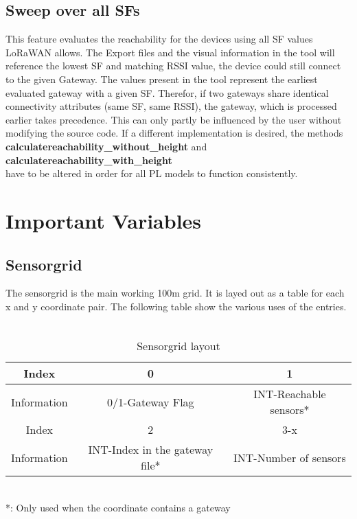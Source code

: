 \documentclass[12pt,a4paper]{article}
\begin{document}
\subsection{Sweep over all SFs}
This feature evaluates the reachability for the devices using all SF values LoRaWAN allows. The Export files and the visual information in the tool will reference the lowest SF and matching RSSI value, the device could still connect to the given Gateway. The values present in the tool represent the earliest evaluated gateway with a given SF. Therefor, if two gateways share identical connectivity attributes (same SF, same RSSI), the gateway, which is processed earlier takes precedence. This can only partly be influenced by the user without modifying the source code. If a different implementation is desired, the methods\\ \textbf{calculatereachability\_without\_height} and \textbf{calculatereachability\_with\_height}\\
have to be altered in order for all PL models to function consistently.
\section{Important Variables}
\subsection{Sensorgrid}
The sensorgrid is the main working 100m grid. It is layed out as a table for each x and y coordinate pair. The following table show the various uses of the entries.\\
\\
\begin{table}[!th]
	\centering
	\caption{Sensorgrid layout}
\begin{tabular}{|c|c|c|}
	\hline
	Index&0&1\\ \hline
	Information&0/1-Gateway Flag&INT-Reachable sensors*\\ \hline
	Index&2&3-x\\ \hline
	Information&INT-Index in the gateway file*&INT-Number of sensors\\ \hline
\end{tabular}
\end{table}
\\
*: Only used when the coordinate contains a gateway
\end{document}
